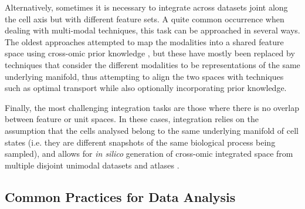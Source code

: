 Alternatively, sometimes it is necessary to integrate across datasets joint along the cell axis but with different feature sets. A quite common occurrence when dealing with multi-modal techniques, this task can be approached in several ways. The oldest approaches attempted to map the modalities into a shared feature space using cross-omic prior knowledge \cite{chen_assessment_2019}, but these have mostly been replaced by techniques that consider the different modalities to be representations of the same underlying manifold, thus attempting to align the two spaces with techniques such as optimal transport while also optionally incorporating prior knowledge\cite{cao_unsupervised_2020, cao_multi-omics_2022}.

Finally, the most challenging integration tasks are those where there is no overlap between feature or unit spaces. In these cases, integration relies on the assumption that the cells analysed belong to the same underlying manifold of cell states (i.e. they are different snapshots of the same biological process being sampled), and allows for \emph{in silico} generation of cross-omic integrated space from multiple disjoint unimodal datasets and atlases \cite{amodio_magan:_2018,lotfollahi_mapping_2022,cao_multi-omics_2022}.


\subsection{Common Practices for Data Analysis}





